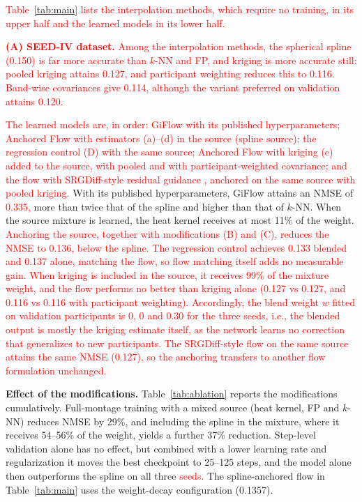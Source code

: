\documentclass{article}
\begin{document}
\textcolor{red}{Table~\ref{tab:main} lists the interpolation methods, which require no
training, in its upper half and the learned models in its lower half.}

\textcolor{red}{\textbf{(A) SEED-IV dataset.} Among the interpolation methods, the
spherical spline (0.150) is far more accurate than $k$-NN and FP, and
kriging is more accurate still: pooled kriging attains 0.127, and
participant weighting reduces this to 0.116. Band-wise covariances give
0.114, although the variant preferred on validation attains 0.120.}

\textcolor{red}{The learned models are, in order: GiFlow with its published
hyperparameters; Anchored Flow with estimators (a)--(d) in the source
(spline source); the regression control (D) with the same source;
Anchored Flow with kriging (e) added to the source, with pooled and with
participant-weighted covariance; and the flow with SRGDiff-style residual
guidance \cite{liu2026srgdiff}, anchored on the same source with pooled
kriging.} With its published hyperparameters, GiFlow attains an NMSE of
\textcolor{red}{0.335,} more than twice that of the spline and higher than that of $k$-NN.
When the source mixture is learned, the heat kernel receives at most 11\%
of the weight. \textcolor{red}{Anchoring the source, together with modifications (B) and
(C), reduces the NMSE to 0.136, below the spline. The regression control
achieves 0.133 blended and 0.137 alone, matching the flow, so flow
matching itself adds no measurable gain. When kriging is included in the
source, it receives 99\% of the mixture weight, and the flow performs no
better than kriging alone (0.127 vs 0.127, and 0.116 vs 0.116 with
participant weighting). Accordingly, the blend weight $w$ fitted on
validation participants is 0, 0 and 0.30 for the three seeds, i.e., the
blended output is mostly the kriging estimate itself, as the network
learns no correction that generalizes to new participants. The
SRGDiff-style flow on the same source attains the same NMSE (0.127), so
the anchoring transfers to another flow formulation unchanged.}

\textbf{Effect of the modifications.} Table~\ref{tab:ablation} reports the
modifications cumulatively. Full-montage training with a mixed source
(heat kernel, FP and $k$-NN) reduces NMSE by 29\%, and including the spline in the mixture, where it
receives 54--56\% of the weight, yields a further 37\% reduction.
Step-level validation alone has no effect, but combined with a lower
learning rate and regularization it moves the best checkpoint to 25--125
steps, and the model alone then outperforms the spline on all three \textcolor{red}{seeds.}
The spline-anchored flow in Table~\ref{tab:main} uses the weight-decay
configuration (0.1357).
\end{document}
